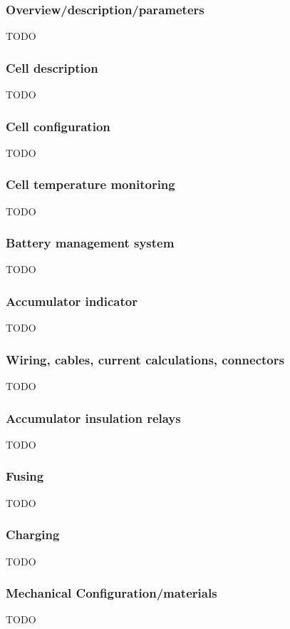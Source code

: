 \documentclass{article}
\begin{document}
\subsubsection{Overview/description/parameters}
TODO

\subsubsection{Cell description}
TODO

\subsubsection{Cell configuration}
TODO

\subsubsection{Cell temperature monitoring}
TODO

\subsubsection{Battery management system}
TODO

\subsubsection{Accumulator indicator}
TODO

\subsubsection{Wiring, cables, current calculations, connectors}
TODO

\subsubsection{Accumulator insulation relays}
TODO

\subsubsection{Fusing}
TODO

\subsubsection{Charging}
TODO

\subsubsection{Mechanical Configuration/materials}
TODO
\end{document}
